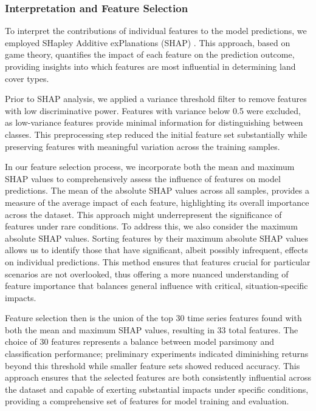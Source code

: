 \documentclass[
  journal,
  twocolumn]{IEEEtran}
\begin{document}
\subsubsection{Interpretation and Feature
Selection}\label{interpretation-and-feature-selection}

To interpret the contributions of individual features to the model
predictions, we employed SHapley Additive exPlanations (SHAP)
\citep{shaps_2017}. This approach, based on game theory, quantifies the
impact of each feature on the prediction outcome, providing insights
into which features are most influential in determining land cover
types.

Prior to SHAP analysis, we applied a variance threshold filter to remove
features with low discriminative power. Features with variance below 0.5
were excluded, as low-variance features provide minimal information for
distinguishing between classes. This preprocessing step reduced the
initial feature set substantially while preserving features with
meaningful variation across the training samples.

In our feature selection process, we incorporate both the mean and
maximum SHAP values to comprehensively assess the influence of features
on model predictions. The mean of the absolute SHAP values across all
samples, provides a measure of the average impact of each feature,
highlighting its overall importance across the dataset. This approach
might underrepresent the significance of features under rare conditions.
To address this, we also consider the maximum absolute SHAP values.
Sorting features by their maximum absolute SHAP values allows us to
identify those that have significant, albeit possibly infrequent,
effects on individual predictions. This method ensures that features
crucial for particular scenarios are not overlooked, thus offering a
more nuanced understanding of feature importance that balances general
influence with critical, situation-specific impacts.

Feature selection then is the union of the top 30 time series features
found with both the mean and maximum SHAP values, resulting in 33 total
features. The choice of 30 features represents a balance between model
parsimony and classification performance; preliminary experiments
indicated diminishing returns beyond this threshold while smaller
feature sets showed reduced accuracy. This approach ensures that the
selected features are both consistently influential across the dataset
and capable of exerting substantial impacts under specific conditions,
providing a comprehensive set of features for model training and
evaluation.
\end{document}
